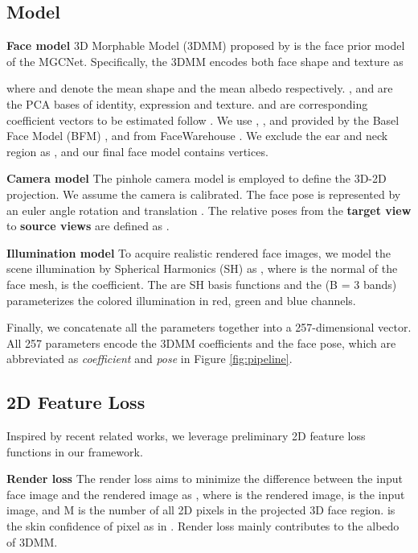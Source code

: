\documentclass[runningheads]{llncs}
\begin{document}
\subsection{Model} \label{method_model}
\textbf{Face model} 3D Morphable Model (3DMM) proposed by \cite{intro_3dmm_blanz1999morphable} is the face prior model of the MGCNet.
Specifically, the 3DMM encodes both face shape and texture as 

where  and  denote the mean shape and the mean albedo respectively.
,  and  are the PCA bases of identity, expression and texture.
 and  are corresponding coefficient vectors to be estimated follow \cite{unsuper_mul_ng2019accurate,unsuper_tewari2017mofa,unsuper_tewari2018self}.
We use , ,  and  provided by the Basel Face Model (BFM) \cite{intro_3dmm_blanz1999morphable,3dmm_paysan20093d}, and  from FaceWarehouse \cite{dataset_cao2013facewarehouse}. 
We exclude the ear and neck region as \cite{unsuper_mul_ng2019accurate}, and our final face model contains  vertices. 

\noindent
\textbf{Camera model} 
The pinhole camera model is employed to define the 3D-2D projection.
We assume the camera is calibrated.
The face pose  is represented by an euler angle rotation  and translation .
The relative poses  from the \textbf{target view} to  \textbf{source views} are defined as .



\noindent
\textbf{Illumination model}
To acquire realistic rendered face images, we model the scene illumination by Spherical Harmonics (SH)  \cite{sh_ramamoorthi2001efficient,sh_ramamoorthi2001signal} as ,
where  is the normal of the face mesh,  is the coefficient. 
The  are SH basis functions and the  (B = 3 bands) parameterizes the colored illumination in red, green and blue channels.

Finally, we concatenate all the parameters together into a  257-dimensional vector. 
All 257 parameters encode the 3DMM coefficients and the face pose, which are abbreviated as \textit{coefficient} and \textit{pose} in Figure \ref{fig:pipeline}.

\subsection{2D Feature Loss} \label{sec:method_common_loss}
Inspired by recent related works, we leverage preliminary 2D feature loss functions in our framework.

\noindent
\textbf{Render loss} 
The render loss aims to minimize the difference between the input face image and the rendered image as ,
where  is the rendered image,  is the input image, and M is the number of all 2D pixels in the projected 3D face region. 
 is the skin confidence of  pixel as in \cite{unsuper_mul_ng2019accurate}. Render loss mainly contributes to the albedo of 3DMM.
\end{document}
